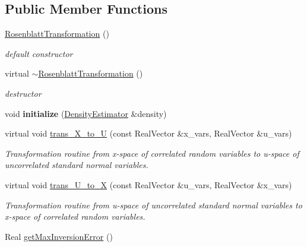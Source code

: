 \subsection*{Public Member Functions}
\begin{DoxyCompactItemize}
\item 
\hyperlink{classPecos_1_1RosenblattTransformation_aec8a0944137fe1c0d1b7315a58e50a3b}{Rosenblatt\+Transformation} ()\label{classPecos_1_1RosenblattTransformation_aec8a0944137fe1c0d1b7315a58e50a3b}

\begin{DoxyCompactList}\small\item\em default constructor \end{DoxyCompactList}\item 
virtual \hyperlink{classPecos_1_1RosenblattTransformation_ad7eed5963c7a5f9fc325692271a8d376}{$\sim$\+Rosenblatt\+Transformation} ()\label{classPecos_1_1RosenblattTransformation_ad7eed5963c7a5f9fc325692271a8d376}

\begin{DoxyCompactList}\small\item\em destructor \end{DoxyCompactList}\item 
void {\bfseries initialize} (\hyperlink{classPecos_1_1DensityEstimator}{Density\+Estimator} \&density)\label{classPecos_1_1RosenblattTransformation_a0a26b1c8000932b51ccd201cf71de76c}

\item 
virtual void \hyperlink{classPecos_1_1RosenblattTransformation_a22c3e4ffde57732ffe3cbb7ab5fce86b}{trans\+\_\+\+X\+\_\+to\+\_\+U} (const Real\+Vector \&x\+\_\+vars, Real\+Vector \&u\+\_\+vars)
\begin{DoxyCompactList}\small\item\em Transformation routine from x-\/space of correlated random variables to u-\/space of uncorrelated standard normal variables. \end{DoxyCompactList}\item 
virtual void \hyperlink{classPecos_1_1RosenblattTransformation_a0a84860a9ed0cec52ed100edb49f209c}{trans\+\_\+\+U\+\_\+to\+\_\+X} (const Real\+Vector \&u\+\_\+vars, Real\+Vector \&x\+\_\+vars)
\begin{DoxyCompactList}\small\item\em Transformation routine from u-\/space of uncorrelated standard normal variables to x-\/space of correlated random variables. \end{DoxyCompactList}\item 
Real \hyperlink{classPecos_1_1RosenblattTransformation_a5aa3ecdc3cdfc4921b0adda79ef36add}{get\+Max\+Inversion\+Error} ()\label{classPecos_1_1RosenblattTransformation_a5aa3ecdc3cdfc4921b0adda79ef36add}


\end{DoxyCompactItemize}
